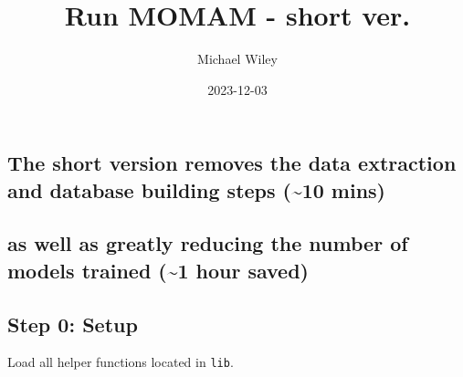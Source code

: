 \documentclass[
]{article}
\title{Run MOMAM - short ver.}
\author{Michael Wiley}
\date{2023-12-03}
\begin{document}
\maketitle

\hypertarget{the-short-version-removes-the-data-extraction-and-database-building-steps-10-mins}{%
\subsection{The short version removes the data extraction and database
building steps (\textasciitilde10
mins)}\label{the-short-version-removes-the-data-extraction-and-database-building-steps-10-mins}}

\hypertarget{as-well-as-greatly-reducing-the-number-of-models-trained-1-hour-saved}{%
\subsection{as well as greatly reducing the number of models trained
(\textasciitilde1 hour
saved)}\label{as-well-as-greatly-reducing-the-number-of-models-trained-1-hour-saved}}

\hypertarget{step-0-setup}{%
\subsection{Step 0: Setup}\label{step-0-setup}}

Load all helper functions located in \texttt{lib}.
\end{document}
